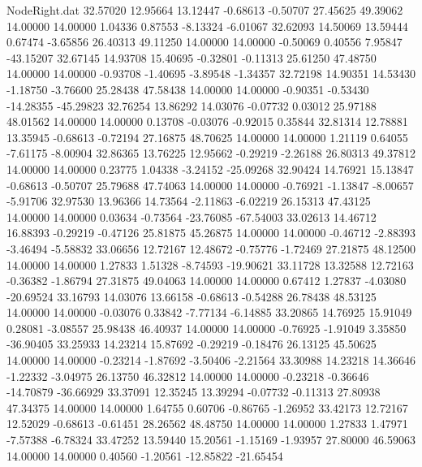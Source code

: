 \begin{filecontents}{NodeRight.dat}
  32.57020   12.95664   13.12447    -0.68613   -0.50707   27.45625   49.39062   14.00000   14.00000    1.04336    0.87553   -8.13324   -6.01067
  32.62093   14.50069   13.59444     0.67474   -3.65856   26.40313   49.11250   14.00000   14.00000   -0.50069    0.40556    7.95847  -43.15207
  32.67145   14.93708   15.40695    -0.32801   -0.11313   25.61250   47.48750   14.00000   14.00000   -0.93708   -1.40695   -3.89548   -1.34357
  32.72198   14.90351   14.53430    -1.18750   -3.76600   25.28438   47.58438   14.00000   14.00000   -0.90351   -0.53430  -14.28355  -45.29823
  32.76254   13.86292   14.03076    -0.07732    0.03012   25.97188   48.01562   14.00000   14.00000    0.13708   -0.03076   -0.92015    0.35844
  32.81314   12.78881   13.35945    -0.68613   -0.72194   27.16875   48.70625   14.00000   14.00000    1.21119    0.64055   -7.61175   -8.00904
  32.86365   13.76225   12.95662    -0.29219   -2.26188   26.80313   49.37812   14.00000   14.00000    0.23775    1.04338   -3.24152  -25.09268
  32.90424   14.76921   15.13847    -0.68613   -0.50707   25.79688   47.74063   14.00000   14.00000   -0.76921   -1.13847   -8.00657   -5.91706
  32.97530   13.96366   14.73564    -2.11863   -6.02219   26.15313   47.43125   14.00000   14.00000    0.03634   -0.73564  -23.76085  -67.54003
  33.02613   14.46712   16.88393    -0.29219   -0.47126   25.81875   45.26875   14.00000   14.00000   -0.46712   -2.88393   -3.46494   -5.58832
  33.06656   12.72167   12.48672    -0.75776   -1.72469   27.21875   48.12500   14.00000   14.00000    1.27833    1.51328   -8.74593  -19.90621
  33.11728   13.32588   12.72163    -0.36382   -1.86794   27.31875   49.04063   14.00000   14.00000    0.67412    1.27837   -4.03080  -20.69524
  33.16793   14.03076   13.66158    -0.68613   -0.54288   26.78438   48.53125   14.00000   14.00000   -0.03076    0.33842   -7.77134   -6.14885
  33.20865   14.76925   15.91049     0.28081   -3.08557   25.98438   46.40937   14.00000   14.00000   -0.76925   -1.91049    3.35850  -36.90405
  33.25933   14.23214   15.87692    -0.29219   -0.18476   26.13125   45.50625   14.00000   14.00000   -0.23214   -1.87692   -3.50406   -2.21564
  33.30988   14.23218   14.36646    -1.22332   -3.04975   26.13750   46.32812   14.00000   14.00000   -0.23218   -0.36646  -14.70879  -36.66929
  33.37091   12.35245   13.39294    -0.07732   -0.11313   27.80938   47.34375   14.00000   14.00000    1.64755    0.60706   -0.86765   -1.26952
  33.42173   12.72167   12.52029    -0.68613   -0.61451   28.26562   48.48750   14.00000   14.00000    1.27833    1.47971   -7.57388   -6.78324
  33.47252   13.59440   15.20561    -1.15169   -1.93957   27.80000   46.59063   14.00000   14.00000    0.40560   -1.20561  -12.85822  -21.65454

\end{filecontents}
